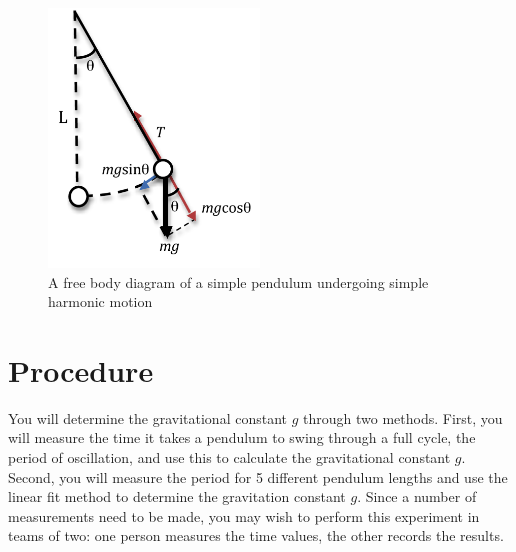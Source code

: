 \begin{figure}[h]
\centering
\includegraphics[width=0.5\textwidth]{./Exp1-2/pic/pendulum.png}
\caption{A free body diagram of a simple pendulum undergoing simple harmonic motion}
\label{fig:pendulum}
\end{figure}

\section{Procedure}

You will determine the gravitational constant $g$ through two methods. First, you will measure the time it takes a pendulum to swing through a full cycle, the period of oscillation, and use this to calculate the gravitational constant $g$. Second, you will measure the period for 5 different pendulum lengths and use the linear fit method to determine the gravitation constant $g$. Since a number of measurements need to be made, you may wish to perform this experiment in teams of two: one person measures the time values, the other records the results. \myskip

